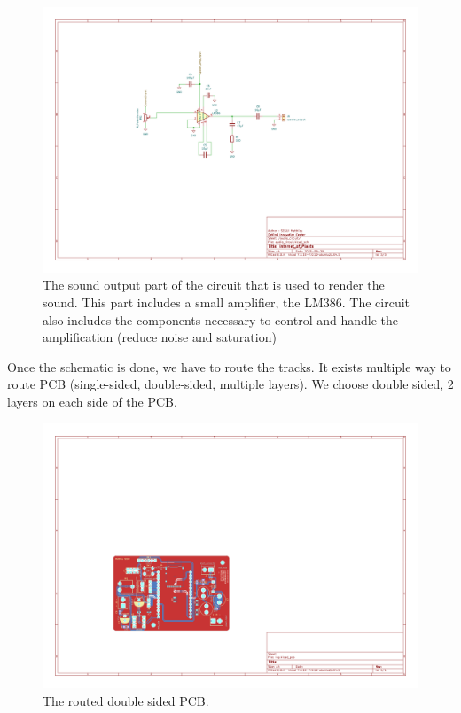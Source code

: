 \begin{figure}[h]
    \centering
    \includegraphics[width=\textwidth]{images/iop-audio_circuit.pdf}
    \caption{The sound output part of the circuit that is used to render the sound. 
    This part includes a small amplifier, the LM386. The circuit also includes the components necessary
    to control and handle the amplification (reduce noise and saturation)} 
    \vspace{0.1cm}
    \label{fig:iop_schematic_audio}
\end{figure}


Once the schematic is done, we have to route the tracks. It exists multiple way to route PCB 
(single-sided, double-sided, multiple layers). We choose double sided, 2 layers on each side of the PCB.

\begin{figure}[h]
    \centering
    \includegraphics[width=\textwidth]{images/iop-routed_pcb.pdf}
    \caption{The routed double sided PCB.} 
    \vspace{0.1cm}
    \label{fig:iop_routed_pcb}
\end{figure}

